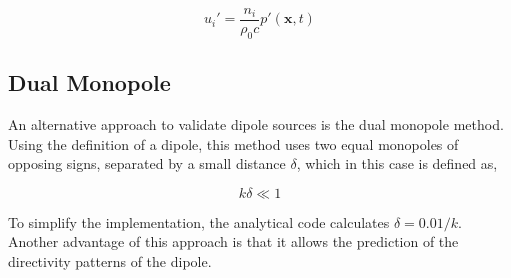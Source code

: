 








\begin{equation}
    u_i' = \frac{n_i}{\rho_0c}p'(\bm{x},t)
    \label{eq:dipole_u2}
\end{equation}

\subsection{Dual Monopole} \label{subsubsec:dual_mono}

An alternative approach to validate dipole sources is the dual monopole method. Using the definition of a dipole, this method uses two equal monopoles of opposing signs, separated by a small distance $\delta$, which in this case is defined as,

\begin{equation}
    k\delta \ll 1
    \label{eq:delta_distance_def}
\end{equation}

To simplify the implementation, the analytical code calculates $\delta=0.01/k$. Another advantage of this approach is that it allows the prediction of the directivity patterns of the dipole.
